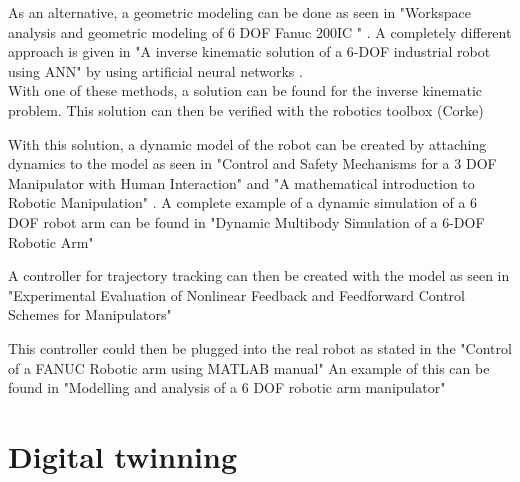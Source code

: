 As an alternative, a geometric modeling can be done as seen in "Workspace analysis and geometric modeling of 6 DOF Fanuc 200IC " \cite{geomModelingKamel}. 
A completely different approach is given in "A inverse kinematic solution of  a 6-DOF industrial robot using ANN" by using artificial neural networks \cite{invKinANNKSHITISH}.\\
%
%
With one of these methods, a solution can be found for the inverse kinematic problem.
This solution can then be verified with the robotics toolbox (Corke)

With this solution, a dynamic model of the robot can be created by attaching dynamics to the model as seen in "Control and Safety Mechanisms for a 3 DOF Manipulator with Human Interaction" \cite{KongWei} and "A mathematical introduction to Robotic Manipulation" \cite{MathIntroRobManip}. A complete example of a dynamic simulation of a 6 \ac{DOF} robot arm can be found in "Dynamic Multibody Simulation of a 6-DOF Robotic Arm" \cite{Dyn6DOFBinLi}

A controller for trajectory tracking can then be created with the model as seen in "Experimental Evaluation of Nonlinear Feedback and Feedforward Control Schemes for Manipulators" \cite{evalNonlinFeedForBackControl}

This controller could then be plugged into the real robot as stated in the "Control of a FANUC Robotic arm using MATLAB manual"  \cite{FANUCcontrolMatlab} An example of this can be found in "Modelling and analysis of a 6 DOF robotic arm manipulator" \cite{RobotModelAnalContrexampleJamshed}



\section{Digital twinning}

